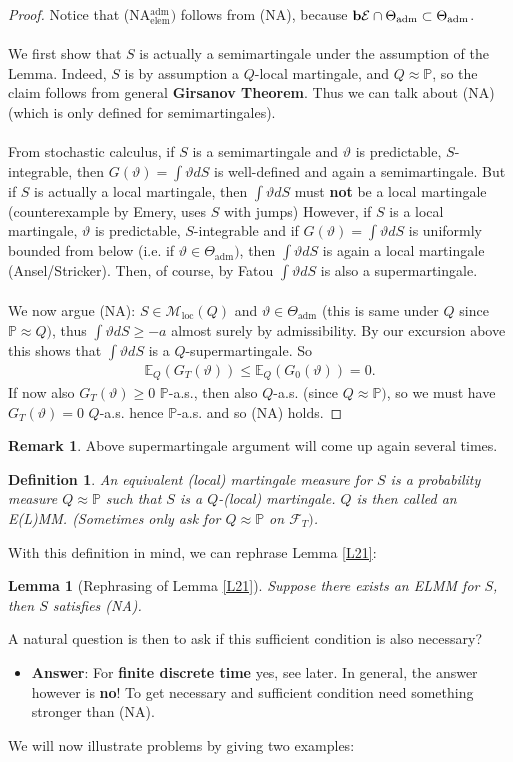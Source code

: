 \documentclass[12pt,a4paper, twoside]{article}
\newtheorem{lem}{Lemma}[section]
\newtheorem{defn}{Definition}[section]
\theoremstyle{definition}
\newtheorem{rem}{Remark}[section]
\newcommand{\EE}{\mathbb{E}} %
\newcommand{\PP}{\mathbb{P}} %
\newcommand{\simple}{\textbf{\text{b}}\mathcal{E}}
\begin{document}
\begin{proof} Notice that (NA$_\text{elem}^\text{adm})$ follows from (NA), because $\simple \cap \Theta_\text{adm} \subset \Theta_\text{adm}$. \\
\\
We first show that $S$ is actually a semimartingale under the assumption of the Lemma. Indeed, $S$ is by assumption a $Q$-local martingale, and $Q \approx \PP$, so the claim follows from general \textbf{Girsanov Theorem}. Thus we can talk about (NA) (which is only defined for semimartingales).
\\\\
From stochastic calculus, if $S$ is a semimartingale and $\vartheta$ is predictable, $S$-integrable, then $G( \vartheta)= \int \vartheta dS$ is well-defined and again a semimartingale. But if $S$ is actually a local martingale,  then $\int \vartheta dS$ must \textbf{not} be a local martingale (counterexample by Emery, uses $S$ with jumps)
\newpage
However, if $S$ is a local martingale, $\vartheta$ is predictable, $S$-integrable and if $G( \vartheta)= \int \vartheta dS$ is uniformly bounded from below (i.e. if $\vartheta \in \Theta_\text{adm})$, then $\int \vartheta dS$ is again a local martingale (Ansel/Stricker). Then, of course, by Fatou $\int \vartheta dS$ is also a supermartingale. 
\\\\
We now argue (NA): $S \in \mathcal{M}_\text{loc}(Q)$ and $\vartheta \in \Theta_\text{adm}$ (this is same under $Q$ since $\PP \approx Q)$,  thus $\int \vartheta dS \geq -a$ almost surely by admissibility. By our excursion above this shows that $\int \vartheta dS$ is a $Q$-supermartingale. So
\begin{align*}
\EE_Q(G_T( \vartheta)) \leq \EE_Q(G_0( \vartheta))=0.
\end{align*}
If now also $G_T( \vartheta) \geq 0$ $\PP$-a.s., then also $Q$-a.s. (since $Q \approx \PP)$, so we must have $G_T( \vartheta)=0$ $Q$-a.s. hence $\PP$-a.s. and so (NA) holds. 
\end{proof}
\begin{rem} Above supermartingale argument will come up again several times. 
\end{rem}
\begin{defn} An equivalent (local) martingale measure for $S$ is a probability measure $Q \approx \PP$ such that $S$ is a $Q$-(local) martingale. $Q$ is then called an E(L)MM. (Sometimes only ask for $Q \approx \PP$ on $\mathcal{F}_T)$. 
\end{defn}
With this definition in mind, we can rephrase Lemma \ref{L21}:
\begin{lem}[Rephrasing of Lemma \ref{L21}] Suppose there exists an ELMM for $S$, then $S$ satisfies (NA). 
\end{lem}
A natural question is then to ask if this sufficient condition is also necessary?
\begin{itemize}
\item \textbf{Answer}: For \textbf{finite discrete time} yes, see later. In general, the answer however is \textbf{no}! To get necessary and sufficient condition need something stronger than (NA). 
\end{itemize}
We will now illustrate problems by giving two examples:
\end{document}
